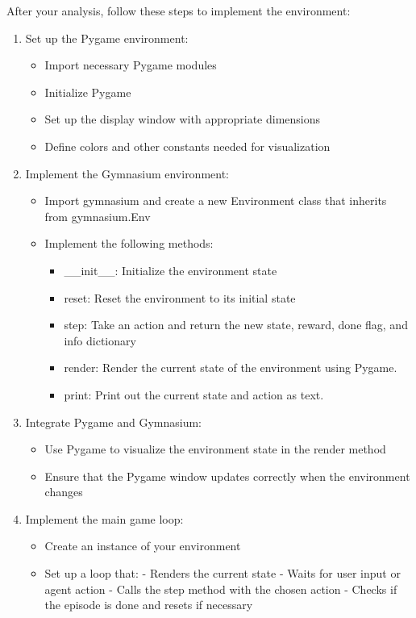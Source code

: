 {\begin{tcolorbox}
After your analysis, follow these steps to implement the environment:

\begin{enumerate}
\item Set up the Pygame environment:
\begin{itemize}
\item Import necessary Pygame modules
\item Initialize Pygame
\item Set up the display window with appropriate dimensions
\item Define colors and other constants needed for visualization
\end{itemize}

\item Implement the Gymnasium environment:
\begin{itemize}
\item Import gymnasium and create a new Environment class that inherits from gymnasium.Env
\item Implement the following methods:
\begin{itemize}
\item \_\_init\_\_: Initialize the environment state
\item reset: Reset the environment to its initial state
\item step: Take an action and return the new state, reward, done flag, and info dictionary
\item render: Render the current state of the environment using Pygame.
\item print: Print out the current state and action as text.
\end{itemize}
\end{itemize}

\item Integrate Pygame and Gymnasium:
\begin{itemize}
\item Use Pygame to visualize the environment state in the render method
\item Ensure that the Pygame window updates correctly when the environment changes
\end{itemize}

\item Implement the main game loop:
\begin{itemize}
\item Create an instance of your environment
\item Set up a loop that:
      - Renders the current state
      - Waits for user input or agent action
      - Calls the step method with the chosen action
      - Checks if the episode is done and resets if necessary
\end{itemize}


\end{enumerate}
\end{tcolorbox}}
